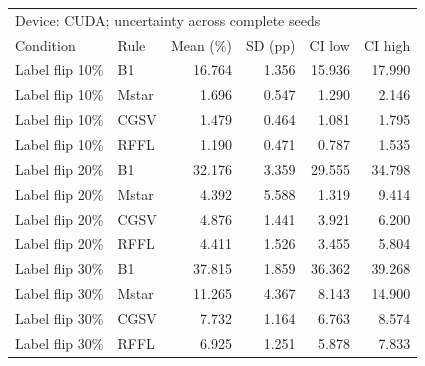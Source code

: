 \begin{tabular}{llrrrr}
\toprule
\multicolumn{6}{l}{Device: CUDA; uncertainty across complete seeds} \\
Condition & Rule & Mean (\%) & SD (pp) & CI low & CI high \\
\midrule
Label flip 10\% & B1 & 16.764 & 1.356 & 15.936 & 17.990 \\
Label flip 10\% & Mstar & 1.696 & 0.547 & 1.290 & 2.146 \\
Label flip 10\% & CGSV & 1.479 & 0.464 & 1.081 & 1.795 \\
Label flip 10\% & RFFL & 1.190 & 0.471 & 0.787 & 1.535 \\
Label flip 20\% & B1 & 32.176 & 3.359 & 29.555 & 34.798 \\
Label flip 20\% & Mstar & 4.392 & 5.588 & 1.319 & 9.414 \\
Label flip 20\% & CGSV & 4.876 & 1.441 & 3.921 & 6.200 \\
Label flip 20\% & RFFL & 4.411 & 1.526 & 3.455 & 5.804 \\
Label flip 30\% & B1 & 37.815 & 1.859 & 36.362 & 39.268 \\
Label flip 30\% & Mstar & 11.265 & 4.367 & 8.143 & 14.900 \\
Label flip 30\% & CGSV & 7.732 & 1.164 & 6.763 & 8.574 \\
Label flip 30\% & RFFL & 6.925 & 1.251 & 5.878 & 7.833 \\
\bottomrule
\end{tabular}
